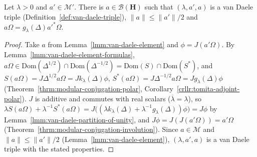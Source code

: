 \begin{lemma}
    \label{lmm:van-daele-commutant-equation}
    \leanok
    Let $\lambda > 0$ and $a' \in \mathcal{M}'$. There is $a \in \mathcal{B}(\mathbf{H})$ such that $(\lambda, a', a)$ is a van Daele triple (Definition~\ref{def:van-daele-triple}), $\|a\| \le \|a'\|/2$ and $a\Omega = g_\lambda(\Delta)a'^*\Omega$.
\end{lemma}
\begin{proof}
    \leanok
    Take $a$ from Lemma~\ref{lmm:van-daele-element} and $\phi = J(a'\Omega)$. By Lemma~\ref{lmm:van-daele-element-formulas}, $a\Omega \in \text{Dom}(\Delta^{1/2}) \cap \text{Dom}(\Delta^{-1/2}) = \text{Dom}(S) \cap \text{Dom}(S^*)$, and $S(a\Omega) = J\Delta^{1/2}a\Omega = Jk_\lambda(\Delta)\phi$, $S^*(a\Omega) = J\Delta^{-1/2}a\Omega = Jg_\lambda(\Delta)\phi$ (Theorem~\ref{thrm:modular-conjugation-polar}, Corollary~\ref{crllr:tomita-adjoint-polar}). $J$ is additive and commutes with real scalars ($\overline{\lambda} = \lambda$), so $\lambda S(a\Omega) + \lambda^{-1}S^*(a\Omega) = J\big((\lambda k_\lambda(\Delta) + \lambda^{-1}g_\lambda(\Delta))\phi\big) = J\phi$ by Lemma~\ref{lmm:van-daele-partition-of-unity}, and $J\phi = J(J(a'\Omega)) = a'\Omega$ (Theorem~\ref{thrm:modular-conjugation-involution}). Since $a \in \mathcal{M}$ and $\|a\| \le \|a'\|/2$ (Lemma~\ref{lmm:van-daele-element}), $(\lambda, a', a)$ is a van Daele triple with the stated properties.
\end{proof}

